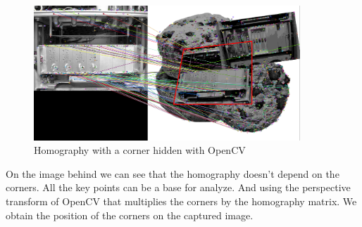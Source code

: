 	\begin{figure}
			\includegraphics[width=10cm]{images_not_compressed/showHomography.png}
			\caption{Homography with a corner hidden with OpenCV}
	\end{figure}
	\par On the image behind we can see that the homography doesn't depend on the corners. All the key points can be a base for analyze. And using the perspective transform of OpenCV that multiplies the corners by the homography matrix. We obtain the position of the corners on the captured image.
